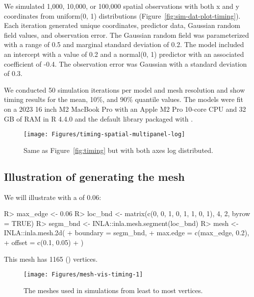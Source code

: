 \documentclass[article]{jss}\usepackage[]{graphicx}\usepackage[dvipsnames]{xcolor}
\newcommand{\R}{\proglang{R}}
\begin{document}
We simulated 1,000, 10,000, or 100,000 spatial observations with both x and y coordinates from uniform(0, 1) distributions (Figure~\ref{fig:sim-dat-plot-timing}).
Each iteration generated unique coordinates, predictor data, Gaussian random field values, and observation error.
The Gaussian random field was parameterized with a range of 0.5 and marginal standard deviation of 0.2.
The model included an intercept with a value of 0.2 and a normal(0, 1) predictor with an associated coefficient of -0.4.
The observation error was Gaussian with a standard deviation of 0.3.

We conducted 50 simulation iterations per model and mesh resolution and show timing results for the mean, 10\%, and 90\% quantile values.
The models were fit on a 2023 16 inch M2 MacBook Pro with an Apple M2 Pro 10-core CPU and 32 GB of RAM in R 4.4.0 and the default  library packaged with \R \citep{r2024}.

\begin{figure}[htb]
\centering
\texttt{[image: Figures/timing-spatial-multipanel-log]}
\caption[]{
  Same as Figure~\ref{fig:timing} but with both axes log distributed.
}
\label{fig:timing2}
\end{figure}


\clearpage

\subsection[Illustration of generating the INLA mesh]{Illustration of generating the  mesh}



We will illustrate with a  of 0.06:

\begin{Schunk}
\begin{Sinput}
R> max_edge <- 0.06
R> loc_bnd <- matrix(c(0, 0, 1, 0, 1, 1, 0, 1), 4, 2, byrow = TRUE)
R> segm_bnd <- INLA::inla.mesh.segment(loc_bnd)
R> mesh <- INLA::inla.mesh.2d(
+    boundary = segm_bnd,
+    max.edge = c(max_edge, 0.2),
+    offset = c(0.1, 0.05)
+  )
\end{Sinput}
\end{Schunk}



This mesh has 1165 () vertices.

\begin{Schunk}
\begin{figure}[ht]

{\centering \texttt{[image: Figures/mesh-vis-timing-1]}

}

\caption[The meshes used in simulations from least to most vertices]{The meshes used in simulations from least to most vertices.}\label{fig:mesh-vis-timing}
\end{figure}
\end{Schunk}
\end{document}
